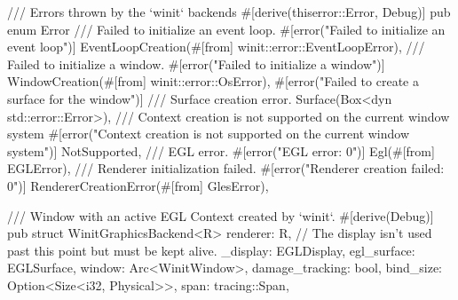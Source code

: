 /// Errors thrown by the `winit` backends
#[derive(thiserror::Error, Debug)]
pub enum Error {
    /// Failed to initialize an event loop.
    #[error("Failed to initialize an event loop")]
    EventLoopCreation(#[from] winit::error::EventLoopError),
    /// Failed to initialize a window.
    #[error("Failed to initialize a window")]
    WindowCreation(#[from] winit::error::OsError),
    #[error("Failed to create a surface for the window")]
    /// Surface creation error.
    Surface(Box<dyn std::error::Error>),
    /// Context creation is not supported on the current window system
    #[error("Context creation is not supported on the current window system")]
    NotSupported,
    /// EGL error.
    #[error("EGL error: {0}")]
    Egl(#[from] EGLError),
    /// Renderer initialization failed.
    #[error("Renderer creation failed: {0}")]
    RendererCreationError(#[from] GlesError),
}

/// Window with an active EGL Context created by `winit`.
#[derive(Debug)]
pub struct WinitGraphicsBackend<R> {
    renderer: R,
    // The display isn't used past this point but must be kept alive.
    _display: EGLDisplay,
    egl_surface: EGLSurface,
    window: Arc<WinitWindow>,
    damage_tracking: bool,
    bind_size: Option<Size<i32, Physical>>,
    span: tracing::Span,
}

